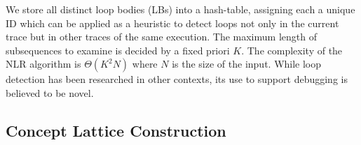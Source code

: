 %

We store all distinct loop bodies (LBs)
into a hash-table, assigning each a unique ID which can be applied as
a heuristic to detect loops not only in the current trace but in other
traces of the same execution.
%
The maximum length of subsequences to examine is decided by a fixed priori $K$.
%
The complexity of the NLR algorithm is $\Theta(K^2N)$ where $N$ is the size of the input. 
%
While loop detection has been researched in other contexts,
its use to support debugging is believed to be novel.

\subsection{Concept Lattice Construction}
\label{subsec:algo-cl}

